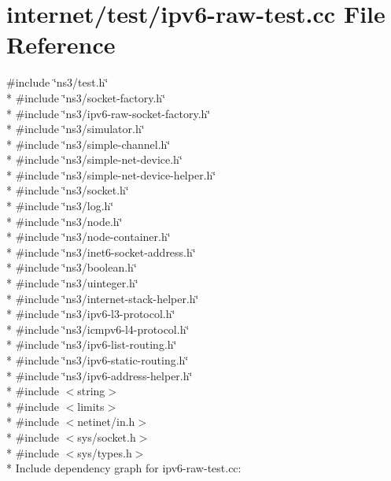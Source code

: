 \hypertarget{ipv6-raw-test_8cc}{}\section{internet/test/ipv6-\/raw-\/test.cc File Reference}
\label{ipv6-raw-test_8cc}
{\ttfamily \#include \char`\"{}ns3/test.\+h\char`\"{}}\\*
{\ttfamily \#include \char`\"{}ns3/socket-\/factory.\+h\char`\"{}}\\*
{\ttfamily \#include \char`\"{}ns3/ipv6-\/raw-\/socket-\/factory.\+h\char`\"{}}\\*
{\ttfamily \#include \char`\"{}ns3/simulator.\+h\char`\"{}}\\*
{\ttfamily \#include \char`\"{}ns3/simple-\/channel.\+h\char`\"{}}\\*
{\ttfamily \#include \char`\"{}ns3/simple-\/net-\/device.\+h\char`\"{}}\\*
{\ttfamily \#include \char`\"{}ns3/simple-\/net-\/device-\/helper.\+h\char`\"{}}\\*
{\ttfamily \#include \char`\"{}ns3/socket.\+h\char`\"{}}\\*
{\ttfamily \#include \char`\"{}ns3/log.\+h\char`\"{}}\\*
{\ttfamily \#include \char`\"{}ns3/node.\+h\char`\"{}}\\*
{\ttfamily \#include \char`\"{}ns3/node-\/container.\+h\char`\"{}}\\*
{\ttfamily \#include \char`\"{}ns3/inet6-\/socket-\/address.\+h\char`\"{}}\\*
{\ttfamily \#include \char`\"{}ns3/boolean.\+h\char`\"{}}\\*
{\ttfamily \#include \char`\"{}ns3/uinteger.\+h\char`\"{}}\\*
{\ttfamily \#include \char`\"{}ns3/internet-\/stack-\/helper.\+h\char`\"{}}\\*
{\ttfamily \#include \char`\"{}ns3/ipv6-\/l3-\/protocol.\+h\char`\"{}}\\*
{\ttfamily \#include \char`\"{}ns3/icmpv6-\/l4-\/protocol.\+h\char`\"{}}\\*
{\ttfamily \#include \char`\"{}ns3/ipv6-\/list-\/routing.\+h\char`\"{}}\\*
{\ttfamily \#include \char`\"{}ns3/ipv6-\/static-\/routing.\+h\char`\"{}}\\*
{\ttfamily \#include \char`\"{}ns3/ipv6-\/address-\/helper.\+h\char`\"{}}\\*
{\ttfamily \#include $<$string$>$}\\*
{\ttfamily \#include $<$limits$>$}\\*
{\ttfamily \#include $<$netinet/in.\+h$>$}\\*
{\ttfamily \#include $<$sys/socket.\+h$>$}\\*
{\ttfamily \#include $<$sys/types.\+h$>$}\\*
Include dependency graph for ipv6-\/raw-\/test.cc\+:
